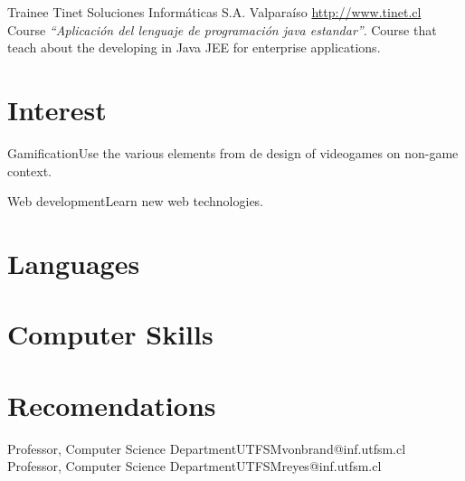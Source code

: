 \documentclass[letter,10pt]{moderncv}
\makeatletter
\renewcommand*{\bibliographyitemlabel}{\@biblabel{\arabic{enumiv}}}
\makeatother
\begin{document}
        {Trainee}
        {Tinet Soluciones Informáticas S.A.}
        {Valparaíso}
        {\url{http://www.tinet.cl}}
        {Course \emph{``Aplicación del lenguaje de programación java estandar''}. Course that teach about the 
	 developing in Java JEE for enterprise applications.}

\section{Interest}
           {Gamification}{Use the various elements from de design of videogames on non-game context.}
			  
	   {Web development}{Learn new web technologies.}

\section{Languages}

\section{Computer Skills}

\section{Recomendations}
        {Professor, Computer Science Department}{UTFSM}{vonbrand@inf.utfsm.cl}{}
        {Professor, Computer Science Department}{UTFSM}{reyes@inf.utfsm.cl}{}


\nocite{*}                                                                           
                                                            
\end{document}
